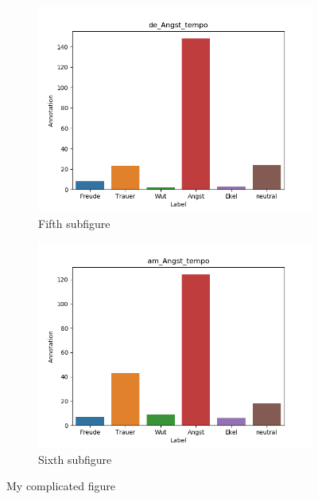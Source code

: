 \documentclass[11pt,a4paper,headsepline,twoside,toc=bibliography]{scrreprt}
\begin{document}
\begin{figure}[t!]
	\medskip
	\begin{subfigure}{0.48\textwidth}
		\includegraphics[width=\linewidth]{plots/de_Angst_tempo.png}
		\caption{Fifth subfigure} \label{fig:de_A_tempo}
	\end{subfigure}\hspace*{\fill}
	\begin{subfigure}{0.48\textwidth}
		\includegraphics[width=\linewidth]{plots/am_Angst_tempo.png}
		\caption{Sixth subfigure} \label{fig:am__A_tempo}
	\end{subfigure}
	
	\caption{My complicated figure} \label{fig:countplots_A}
\end{figure}
\end{document}
